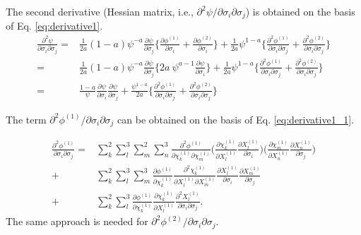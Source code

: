 \documentclass[12pt]{amsart}
\begin{document}
The second derivative (Hessian matrix, i.e., $\partial^2\psi/\partial\sigma_i\partial\sigma_j$) is obtained on the basis of Eq. \ref{eq:derivative1}.
\begin{equation}
  \label{eq:derivative2}
  \begin{split}
    \frac{\partial^2\psi}{\partial\sigma_i\partial\sigma_j}=&\frac{1}{2a} (1-a)\psi^{-a}\frac{\partial\psi}{\partial\sigma_j}  \bigg\{\frac{\partial\phi^{(1)}}{\partial\sigma_i}+\frac{\partial\phi^{(2)}}{\partial\sigma_i}\bigg\}+\frac{1}{2a}\psi^{1-a}   \bigg\{\frac{\partial^2\phi^{(1)}}{\partial\sigma_i\partial\sigma_j}+\frac{\partial^2\phi^{(2)}}{\partial\sigma_i\partial\sigma_j}\bigg\}\\
    =&\frac{1}{2a} (1-a)\psi^{-a}\frac{\partial\psi}{\partial\sigma_j}  \bigg\{2a\ \psi^{a-1} \frac{\partial\psi}{\partial\sigma_i} \bigg\}                +\frac{1}{2a}\psi^{1-a}   \bigg\{\frac{\partial^2\phi^{(1)}}{\partial\sigma_i\partial\sigma_j}+\frac{\partial^2\phi^{(2)}}{\partial\sigma_i\partial\sigma_j}\bigg\}\\
    =&\frac{1-a}{\psi}\frac{\partial\psi}{\partial\sigma_i}  \frac{\partial\psi}{\partial\sigma_j}   +\frac{\psi^{1-a}}{2a} \bigg\{\frac{\partial^2\phi^{(1)}}{\partial\sigma_i\partial\sigma_j}+\frac{\partial^2\phi^{(2)}}{\partial\sigma_i\partial\sigma_j}\bigg\}
  \end{split}
\end{equation}

The term $\partial^2\phi^{(1)}/\partial\sigma_i\partial\sigma_j$ can be obtained on the basis of Eq. \ref{eq:derivative1_1}.

\begin{equation}
  \label{eq:derivative_2_1}
  \begin{split}
    \frac{\partial^2\phi^{(1)}}{\partial\sigma_i\partial\sigma_j}=&\sum_k^2 \sum_l^3 \sum_m^2 \sum_n^3 \frac{\partial^2\phi^{(1)}}{\partial\chi^{(1)}_k\partial\chi^{(1)}_m} \bigg( \frac{\partial\chi^{(1)}_k}{\partial X^{(1)}_l}    \frac{\partial X^{(1)}_l}{\partial \sigma_i}\bigg)  \bigg( \frac{\partial\chi^{(1)}_m}{\partial X^{(1)}_n}    \frac{\partial X^{(1)}_n}{\partial \sigma_j}\bigg)\\
    +&\sum_k^2 \sum_l^3 \sum_m^3 \frac{\partial\phi^{(1)} }{\partial\chi^{(1)}_k}     \frac{\partial^2\chi^{(1)}_k}{\partial X^{(1)}_l \partial  X^{(1)}_m}   \frac{\partial X^{(1)}_l}{\partial\sigma_i}    \frac{\partial X^{(1)}_m}{\partial\sigma_j}\\
    +&\sum_k^2 \sum_l^3 \frac{\partial\phi^{(1)} }{\partial\chi^{(1)}_k}   \frac{\partial\chi^{(1)}_k}{\partial X^{(1)}_l}  \frac{\partial^2 X^{(1)}_l}{\partial\sigma_i\partial\sigma_j}.
  \end{split}
\end{equation}
The same approach is needed for $\partial^2\phi^{(2)}/\partial\sigma_i\partial\sigma_j$.
\end{document}
